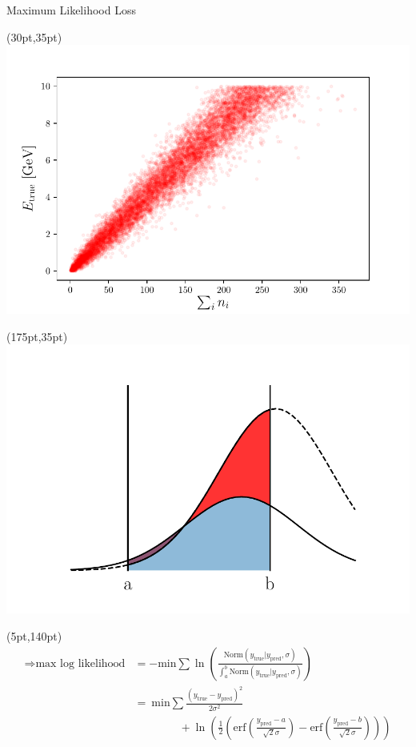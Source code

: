 \documentclass[10pt]{beamer}
\begin{document}
\begin{frame}{Maximum Likelihood Loss}
  \begin{textblock*}{150pt}(30pt,35pt)
    \includegraphics[width=\textwidth]{../images/e-vs-sum_n.pdf}
  \end{textblock*}
  \begin{textblock*}{150pt}(175pt,35pt)
    \includegraphics[width=\textwidth]{./images/gaussian_shift.pdf}
  \end{textblock*}

  \begin{textblock*}{150pt}(5pt,140pt)
    \begin{align*}
      \Rightarrow \text{max log likelihood} &= -\text{min} \sum \ln(\frac{\text{Norm}(y_{\text{true}} | y_{\text{pred}}, \sigma)}{\int^b_a \text{Norm}(y_{\text{true}} | y_{\text{pred}}, \sigma)})\\
                                            &=\ \text{min} \sum \frac{(y_{\text{true}}-y_{\text{pred}})^2}{2 \sigma^2}\\
                                            &\qquad \qquad +\ln(\frac{1}{2} \left(\text{erf}(\frac{y_{\text{pred}}-a}{\sqrt{2}\sigma}) - \text{erf}(\frac{y_{\text{pred}}-b}{\sqrt{2}\sigma})\right))
    \end{align*}
  \end{textblock*}
\end{frame}
\end{document}
